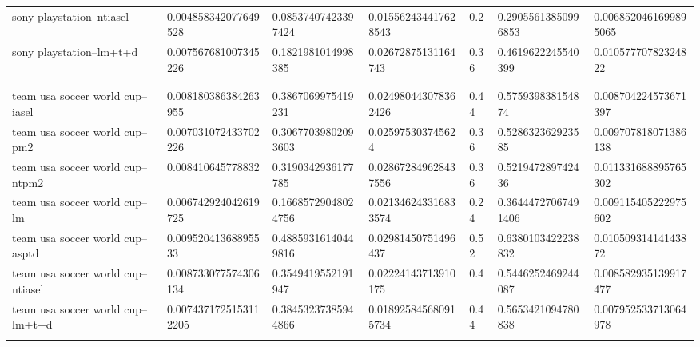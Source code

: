 \begin{table}[h]
\begin{tabular}{lllllll}
sony playstation--ntiasel             & 0.004858342077649528  & 0.08537407423397424 & 0.015562434417628543 & 0.2                 & 0.29055613850996853 & 0.0068520461699895065 \\
sony playstation--lm+t+d              & 0.007567681007345226  & 0.1821981014998385  & 0.02672875131164743  & 0.36                & 0.4619622245540399  & 0.01057770782324822   \\
                                      &                       &                     &                      &                     &                     &                       \\
                                      &                       &                     &                      &                     &                     &                       \\
team usa soccer world cup--iasel      & 0.008180386384263955  & 0.3867069975419231  & 0.024980443078362426 & 0.44                & 0.575939838154874   & 0.008704224573671397  \\
team usa soccer world cup--pm2        & 0.007031072433702226  & 0.30677039802093603 & 0.025975303745624    & 0.36                & 0.528632362923585   & 0.009707818071386138  \\
team usa soccer world cup--ntpm2      & 0.008410645778832     & 0.3190342936177785  & 0.028672849628437556 & 0.36                & 0.521947289742436   & 0.011331688895765302  \\
team usa soccer world cup--lm         & 0.006742924042619725  & 0.16685729048024756 & 0.021346243316833574 & 0.24                & 0.36444727067491406 & 0.009115405222975602  \\
team usa soccer world cup--asptd      & 0.00952041368895533   & 0.48859316140449816 & 0.02981450751496437  & 0.52                & 0.6380103422238832  & 0.01050931414143872   \\
team usa soccer world cup--ntiasel    & 0.008733077574306134  & 0.3549419552191947  & 0.02224143713910175  & 0.4                 & 0.5446252469244087  & 0.008582935139917477  \\
team usa soccer world cup--lm+t+d     & 0.0074371725153112205 & 0.38453237385944866 & 0.018925845680915734 & 0.44                & 0.5653421094780838  & 0.007952533713064978  \\
                                      &                       &                     &                      &                     &                     &                       \\

\end{tabular}
\end{table}
